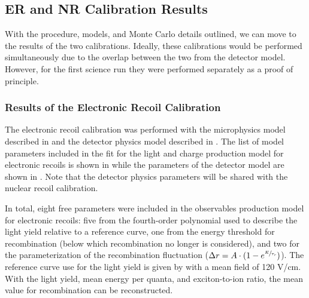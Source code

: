 


\subsection{ER and NR Calibration Results}
\label{sec:xe1t_er_nr_results}

With the procedure, models, and Monte Carlo details outlined, we can move to the results of the two calibrations.  Ideally, these calibrations would be performed simultaneously due to the overlap between the two from the detector model.  However, for the first science run they were performed separately as a proof of principle.


\subsubsection{Results of the Electronic Recoil Calibration}
\label{sec:xe1t_er_cal_results}

The electronic recoil calibration was performed with the microphysics model described in  and the detector physics model described in .  The list of model parameters included in the fit for the light and charge production model for electronic recoils is shown in  while the parameters of the detector model are shown in .  Note that the detector physics parameters will be shared with the nuclear recoil calibration.

In total, eight free parameters were included in the observables production model for electronic recoils: five from the fourth-order polynomial used to describe the light yield relative to a reference curve, one from the energy threshold for recombination (below which recombination no longer is considered), and two for the parameterization of the recombination fluctuation ($\Delta r = A \cdot (1 - e^{\sfrac{E}{\tau_r}})$).  The reference curve use for the light yield is given by  with a mean field of 120 V/cm.  With the light yield, mean energy per quanta, and exciton-to-ion ratio, the mean value for recombination can be reconstructed.  



